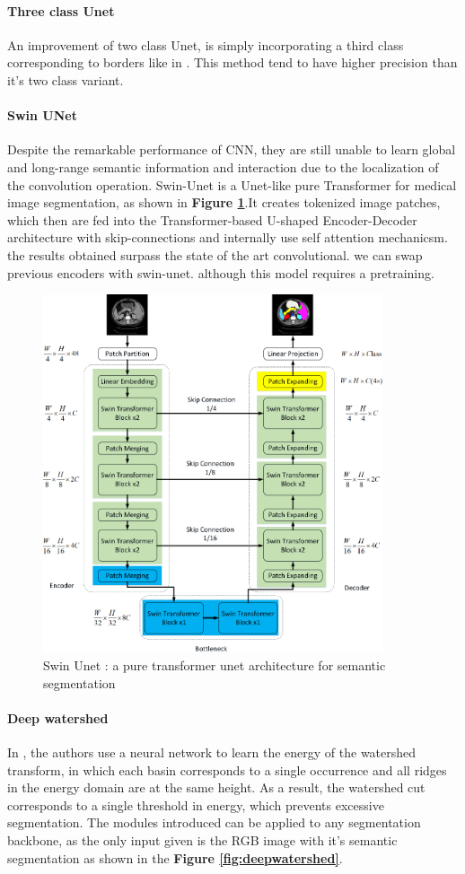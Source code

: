 \documentclass[main.tex]{subfiles}
\begin{document}
\paragraph{Three class Unet} An improvement of two class Unet, is simply incorporating a third class corresponding to borders like in \cite{Caicedo2019}. This method tend to have higher precision than it's two class variant.
\paragraph{Swin UNet}\cite{Cao2021} Despite the remarkable performance of CNN, they are still unable to learn global and long-range semantic information and interaction due to the localization of the convolution operation. Swin-Unet is a Unet-like pure Transformer for medical image segmentation, as shown in \textbf{Figure \ref{fig:swin}}.It creates tokenized image patches, which then are fed into the Transformer-based U-shaped Encoder-Decoder architecture with skip-connections and internally use self attention mechanicsm. the results obtained surpass the state of the art convolutional. we can swap previous encoders with swin-unet. although this model requires a pretraining.

\begin{figure}
    \centering
    \includegraphics[width=10cm]{images/swin.png}
    \caption{Swin Unet : a pure transformer unet architecture for semantic segmentation}
    \label{fig:swin}
\end{figure}

\paragraph{Deep watershed}In \cite{Bai2016}, the authors use a neural network to learn the energy of the watershed transform, in which each basin corresponds to a single occurrence and all ridges in the energy domain are at the same height. As a result, the watershed cut corresponds to a single threshold in energy, which prevents excessive segmentation. The modules introduced can be applied to any segmentation backbone, as the only input given is the RGB image with it's semantic segmentation as shown in the \textbf{Figure \ref{fig:deepwatershed}}.
\end{document}
